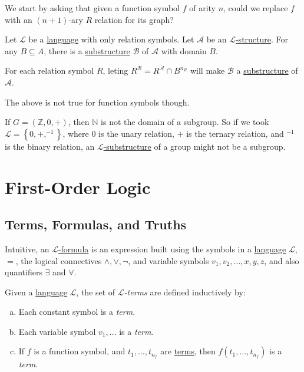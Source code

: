 We start by asking that given a function symbol \(f\) of arity \(n\), could we replace \(f\) with an \((n+1)\)-ary \(R\) relation for its graph?

\begin{eg}
	Let \(\mathcal{L} \) be a \hyperref[def:language]{language} with only relation symbols. Let \(\mathcal{A} \) be an \hyperref[def:structure]{\(\mathcal{L} \)-structure}. For any \(B \subseteq A\), there is a \hyperref[def:substructure]{substructure} \(\mathcal{B} \) of \(\mathcal{A} \) with domain \(B\).
\end{eg}
\begin{explanation}
	For each relation symbol \(R\), leting \(R^{\mathcal{B} } =R^{\mathcal{A} }  \cap B^{n_R}\) will make \(\mathcal{B} \) a \hyperref[def:substructure]{substructure} of \(\mathcal{A} \).
\end{explanation}

The above is not true for function symbols though.

\begin{eg}
	If \(G=(\mathbb{Z} , 0, +)\), then \(\mathbb{N} \) is not the domain of a subgroup. So if we took \(\mathcal{L} =\left\{ 0, +, ^{-1}  \right\} \), where \(0\) is the unary relation, \(+\) is the ternary relation, and \(^{-1} \) is the binary relation, an \hyperref[def:substructure]{\(\mathcal{L} \)-substructure} of a group might not be a subgroup.
\end{eg}

\section{First-Order Logic}
\subsection{Terms, Formulas, and Truths}
Intuitive, an \hyperref[def:formula]{\(\mathcal{L} \)-formula} is an expression built using the symbols in a \hyperref[def:language]{language} \(\mathcal{L} \), \(=\), the logical connectives \(\land, \lor, \lnot\), and variable symbols \(v_1, v_2, \ldots , x, y, z\), and also quantifiers \(\exists \) and \(\forall \).

\begin{definition}[Term]\label{def:term}
	Given a \hyperref[def:language]{language} \(\mathcal{L} \), the set of \emph{\(\mathcal{L} \)-terms} are defined inductively by:
	\begin{enumerate}[(a)]
		\item Each constant symbol is a \emph{term}.
		\item Each variable symbol \(v_1, \ldots \) is a \emph{term}.
		\item If \(f\) is a function symbol, and \(t_1, \ldots , t_{n_f}\) are \hyperref[def:term]{terms}, then \(f(t_1, \ldots , t_{n_f})\) is a \emph{term}.
	\end{enumerate}
\end{definition}

